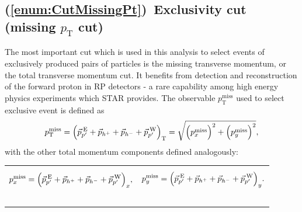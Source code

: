 
\subsection{(\ref{enum:CutMissingPt})~Exclusivity cut (missing \texorpdfstring{$p_{\text{T}}$}{pT} cut)}\label{subsec:ptMiss}

The most important cut which is used in this analysis to select events of exclusively produced pairs of particles is the missing transverse momentum, or the total transverse momentum cut. It benefits from detection and reconstruction of the forward proton in RP detectors - a rare capability among high energy physics experiments which STAR provides. The observable $p_{\text{T}}^{\text{miss}}$ used to select exclusive event is defined as
\begin{equation}\label{eq:missingPt}
 p_{\text{T}}^{\text{miss}} = \Big( \vec{p}_{p'}^{\hspace*{2pt}\text{E}} + \vec{p}_{h^{+}} + \vec{p}_{h^{-}} + \vec{p}_{p'}^{\hspace*{2pt}\text{W}} \Big)_{\text{T}} = \sqrt{\Big(p_{x}^{\text{miss}}\Big)^{2} + \Big(p_{y}^{\text{miss}}\Big)^{2}},
\end{equation}
with the other total momentum components defined analogously:\\
\begin{tabulary}{\textwidth}{LL}
\begin{equation}\label{eq:missingPx}
 p_{x}^{\text{miss}} = \Big( \vec{p}_{p'}^{\hspace*{2pt}\text{E}} + \vec{p}_{h^{+}} + \vec{p}_{h^{-}} + \vec{p}_{p'}^{\hspace*{2pt}\text{W}} \Big)_{x},
\end{equation}~~~~~~~~~~~~~~~~~~~~~
&
\begin{equation}\label{eq:missingPy}
 p_{y}^{\text{miss}} = \Big( \vec{p}_{p'}^{\hspace*{2pt}\text{E}} + \vec{p}_{h^{+}} + \vec{p}_{h^{-}} + \vec{p}_{p'}^{\hspace*{2pt}\text{W}} \Big)_{y}.
\end{equation}~~~~~~~~~~~~~~~~~~~~~
\end{tabulary}


